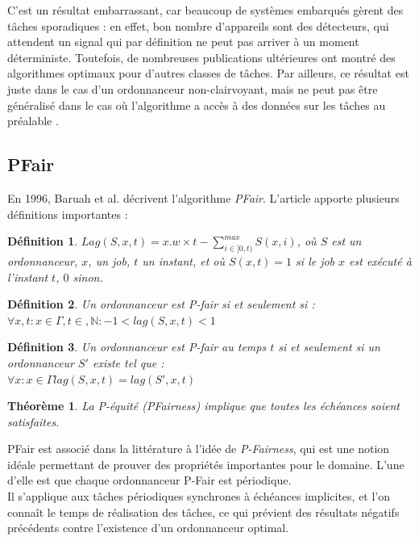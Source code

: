 \documentclass[11pt,a4paper,oneside]{report}
\newtheorem{mydef}{Définition}
\newtheorem{mytheorem}{Théorème}
\begin{document}
C'est un résultat embarrassant, car beaucoup de systèmes embarqués gèrent des tâches sporadiques :
en effet, bon nombre d'appareils sont des détecteurs, qui attendent un signal qui par définition 
ne peut pas arriver à un moment déterministe. 
Toutefois, de nombreuses publications ultérieures ont montré des algorithmes 
optimaux pour d'autres classes de tâches. Par ailleurs, ce résultat est juste dans le cas 
d'un ordonnanceur non-clairvoyant, mais ne peut pas être généralisé dans le cas où 
l'algorithme a accès à des données sur les tâches au préalable \cite{fisher_optimal_2010}.

\subsection{PFair}
En 1996, Baruah et al. décrivent l'algorithme \textit{PFair}.
L'article apporte plusieurs définitions importantes :
\begin{mydef}
	$Lag(S, x, t) = x.w \times t - \sum_{i\in[0,t)}^{max} S(x, i)$, où 
	$S$ est un ordonnanceur, $x$, un job, $t$ un instant, et où $S(x, t) = 1$ si 
	le job $x$ est exécuté à l'instant $t$, $0$ sinon.
\end{mydef}
\begin{mydef}
	Un ordonnanceur est P-fair si et seulement si :\\
	$\forall x, t : x \in \Gamma, t\in , \mathbb{N} : -1 < lag(S,x,t) < 1$
\end{mydef}
\begin{mydef}
	Un ordonnanceur est P-fair au temps $t$ si et seulement si un ordonnanceur $S'$ existe tel que : \\
	$\forall x: x \in \Gamma  lag(S,x,t) = lag(S',x,t)$
\end{mydef}
\begin{mytheorem}
	La P-équité (PFairness) implique que toutes les échéances soient satisfaites.
\end{mytheorem}

PFair est associé dans la littérature à l'idée de \textit{P-Fairness}, qui est une notion 
idéale permettant de prouver des propriétés importantes pour le domaine. 
L'une d'elle est que chaque ordonnanceur P-Fair est périodique. \\

Il s'applique aux tâches périodiques synchrones à échéances implicites, 
et l'on connaît le temps de réalisation des tâches, 
ce qui prévient des résultats négatifs précédents contre 
l'existence d'un ordonnanceur optimal.\\
\end{document}
